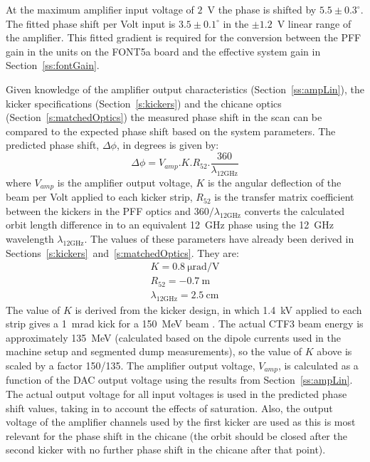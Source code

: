 At the maximum amplifier input voltage of \(2\)~V the phase is shifted by \(5.5\pm0.3^\circ\). The fitted phase shift per Volt input is \(3.5\pm0.1^\circ\) in the \(\pm1.2\)~V linear range of the amplifier. This fitted gradient is required for the conversion between the PFF gain in the units on the FONT5a board and the effective system gain in Section~\ref{ss:fontGain}. %

Given knowledge of the amplifier output characteristics (Section~\ref{ss:ampLin}), the kicker specifications (Section~\ref{s:kickers}) and the chicane optics (Section~\ref{s:matchedOptics}) the measured phase shift in the scan can be compared to the expected phase shift based on the system parameters. The predicted phase shift, \(\Delta\phi\), in degrees is given by:
\begin{equation}
 	\Delta\phi = V_{amp}.K.R_{52}.\frac{360}{\lambda_{12\mathrm{GHz}}}
 	\label{e:ampVoltToPhase}
\end{equation} 
where \(V_{amp}\) is the amplifier output voltage, \(K\) is the angular deflection of the beam per Volt applied to each kicker strip, \(R_{52}\) is the transfer matrix coefficient between the kickers in the PFF optics and \(360/\lambda_{12\mathrm{GHz}}\) converts the calculated orbit length difference in to an equivalent 12~GHz phase using the 12~GHz wavelength \(\lambda_{12\mathrm{GHz}}\). The values of these parameters have already been derived in Sections~\ref{s:kickers}~and~\ref{s:matchedOptics}. They are:
\begin{eqnarray*}
K = 0.8~\mathrm{\mu rad/V}\\
R_{52} = -0.7~\mathrm{m}\\
\lambda_{12\mathrm{GHz}} = 2.5~\mathrm{cm} 
\end{eqnarray*}
The value of \(K\) is derived from the kicker design, in which 1.4~kV applied to each strip gives a 1~mrad kick for a 150~MeV beam \cite{kickerIPAC11}.  The actual CTF3 beam energy is approximately 135~MeV (calculated based on the dipole currents used in the machine setup and segmented dump measurements), so the value of \(K\) above is scaled by a factor 150/135.
The amplifier output voltage, \(V_{amp}\), is calculated as a function of the DAC output voltage using the results from Section~\ref{ss:ampLin}. The actual output voltage for all input voltages is used in the predicted phase shift values, taking in to account the effects of saturation. Also, the output voltage of the amplifier channels used by the first kicker are used as this is most relevant for the phase shift in the chicane (the orbit should be closed after the second kicker with no further phase shift in the chicane after that point). 

